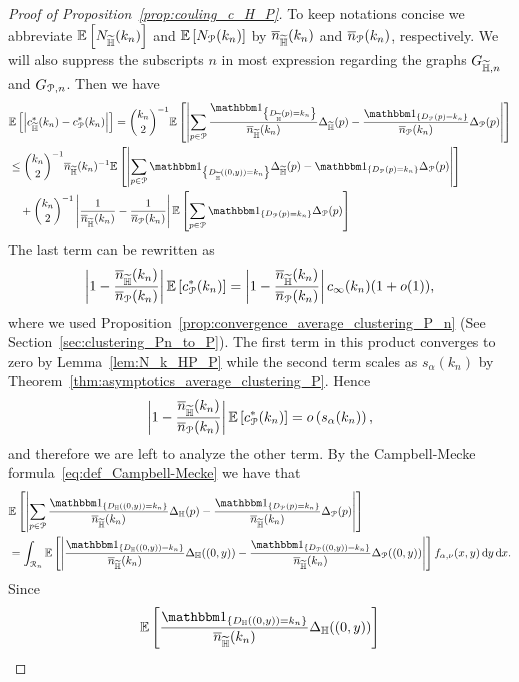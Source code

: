 \begin{proof}[Proof of Proposition~\ref{prop:couling_c_H_P}] 
To keep notations concise we abbreviate $\mathbb{E}\left[N_{\widetilde{\mathbb{H}}} (k_n)\right]$ and $\mathbb{E}\left[N_{{\mathcal P}} (k_n)\right]$ by $\overline{n}_{\widetilde{\mathbb{H}}}(k_n)$ and $\overline{n}_{{\mathcal P}}(k_n)$, respectively. We will also suppress the subscripts $n$ in most expression regarding the graphs $G_{\widetilde{\mathbb{H}},n}$ and $G_{{\mathcal P},n}$. Then we have
\begin{align*} 
	&\Exp{\left|  c_{\HP}^\ast(k_n) - c_{\Pcal}^\ast(k_n)\right|}= 
	\binom{k_n}{2}^{-1}\Exp{\left|\sum_{p \in \Pcal} 
    	\frac{\ind{D_{\HP}(p) = k_n}}{\expH} \Delta_{\HP}(p )
        - \frac{\ind{D_\Pcal(p) = k_n}}{\expP}  \Delta_\Pcal(p)\right|} \\
    &\le\binom{k_n}{2}^{-1} \expH^{-1} \Exp{\left|\sum_{p \in \Pcal} \ind{D_{\HP}((0,y)) = k_n} \Delta_{\HP}(p) 
    	- \ind{D_\Pcal(p) = k_n} \Delta_\Pcal(p)\right|} \\
    &\hspace{10pt}+ \binom{k_n}{2}^{-1} \left|\frac{1}{\expH} - \frac{1}{\expP}\right|\Exp{
        	\sum_{p \in \Pcal} \ind{D_\Pcal(p) = k_n} \Delta_\Pcal(p) }
\end{align*}
The last term can be rewritten as
\begin{align*}
	\left|1 - \frac{\overline{n}_{\widetilde{\mathbb{H}}}(k_n)}{\overline{n}_{{\mathcal P}}(k_n)}\right| \mathbb{E}\left[c_{{\mathcal P}}^\ast(k_n)\right] = \left|1 - \frac{\overline{n}_{\widetilde{\mathbb{H}}}(k_n)}{\overline{n}_{{\mathcal P}}(k_n)}\right|c_\infty(k_n)(1+o(1)),
\end{align*}
where we used Proposition~\ref{prop:convergence_average_clustering_P_n} (See Section~\ref{sec:clustering_Pn_to_P}). The first term in this product converges to zero by Lemma~\ref{lem:N_k_HP_P} while the second term scales as $s_\alpha(k_n)$ by Theorem~\ref{thm:asymptotics_average_clustering_P}. Hence
\[
	\left|1 - \frac{\overline{n}_{\widetilde{\mathbb{H}}}(k_n)}{\overline{n}_{{\mathcal P}}(k_n)}\right| \mathbb{E}\left[c_{{\mathcal P}}^\ast(k_n)\right] = o\left(s_\alpha(k_n)\right),
\]
and therefore we are left to analyze the other term. By the Campbell-Mecke formula~\eqref{eq:def_Campbell-Mecke} we have that
\begin{align*}
	    &\Exp{\left|\sum_{p \in \Pcal} \frac{\ind{D_\H((0,y)) = k_n}}{\expH} \Delta_\H(p) 
	        	- \frac{\ind{D_\Pcal(p) = k_n}}{\expH} \Delta_\Pcal(p)\right|} \\
	    &= \int_{\Rcal_n} 
	        \Exp{\left|\frac{\ind{D_\H((0,y)) = k_n}}{\expH} \Delta_\H ((0,y) ) 
	        - \frac{\ind{D_\Pcal((0,y)) = k_n}}{\expH} \Delta_\Pcal ((0,y))\right|} 
	        	f_{\alpha,\nu}(x,y) \dd y \dd x.
\end{align*}
Since 
\begin{align*}
	\Exp{\frac{\ind{D_\H((0,y)) = k_n}}{\expH} \Delta_\H ((0,y) )}

\end{align*}
\end{proof}
